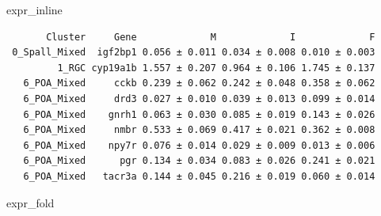 \documentclass[
  landscape]{article}
\newenvironment{Shaded}{\begin{snugshade}}{\end{snugshade}}
\newcommand{\NormalTok}[1]{#1}
\begin{document}
\begin{Shaded}
\begin{Highlighting}[]
\NormalTok{expr\_inline}
\end{Highlighting}
\end{Shaded}

\begin{verbatim}
       Cluster     Gene             M             I             F
 0_Spall_Mixed  igf2bp1 0.056 ± 0.011 0.034 ± 0.008 0.010 ± 0.003
         1_RGC cyp19a1b 1.557 ± 0.207 0.964 ± 0.106 1.745 ± 0.137
   6_POA_Mixed     cckb 0.239 ± 0.062 0.242 ± 0.048 0.358 ± 0.062
   6_POA_Mixed     drd3 0.027 ± 0.010 0.039 ± 0.013 0.099 ± 0.014
   6_POA_Mixed    gnrh1 0.063 ± 0.030 0.085 ± 0.019 0.143 ± 0.026
   6_POA_Mixed     nmbr 0.533 ± 0.069 0.417 ± 0.021 0.362 ± 0.008
   6_POA_Mixed    npy7r 0.076 ± 0.014 0.029 ± 0.009 0.013 ± 0.006
   6_POA_Mixed      pgr 0.134 ± 0.034 0.083 ± 0.026 0.241 ± 0.021
   6_POA_Mixed   tacr3a 0.144 ± 0.045 0.216 ± 0.019 0.060 ± 0.014
\end{verbatim}

\begin{Shaded}
\begin{Highlighting}[]
\NormalTok{expr\_fold}
\end{Highlighting}
\end{Shaded}
\end{document}
